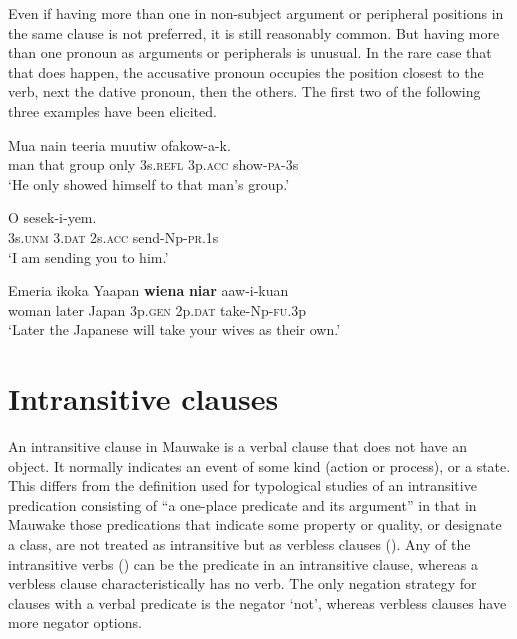 Even if having more than one  in non-subject argument or peripheral positions in the same clause is not preferred, it is still reasonably common. But having more than one pronoun as arguments or peripherals is unusual. In the rare case that that does happen, the accusative pronoun occupies the position closest to the verb, next the dative pronoun, then the others. The first two of the following three examples have been elicited.

\ea%
\label{ex:5:x1574}
\gll Mua  nain  teeria  muutiw     ofakow-a-k. \\
     man  that  group  only  3s.\textsc{refl}  3p.\textsc{acc}  show-\textsc{pa}-3s \\
\glt `He only showed himself to that man's group.'
\z

\ea%
\label{ex:5:x1577}
\gll O     sesek-i-yem. \\
     3s.\textsc{unm}  3.\textsc{dat}  2s.\textsc{acc}  send-Np-\textsc{pr}.1s \\
\glt `I am sending you to him.'
\z

\ea%
\label{ex:5:x1575}
\gll Emeria  ikoka  Yaapan  \textbf{wiena}  \textbf{niar}  aaw-i-kuan \\
     woman  later  Japan  3p.\textsc{gen}  2p.\textsc{dat}  take-Np-\textsc{fu}.3p \\
\glt `Later the Japanese will take your wives as their own.'
\z
 
\section{Intransitive clauses}

An intransitive clause in Mauwake is a verbal clause that does not have an object. It normally indicates an event of some kind (action or process), or a state. This differs from the definition used for typological studies of an intransitive predication consisting of ``a one-place predicate and its argument'' \citep[9]{Stassen1997} in that in Mauwake those predications that indicate some property or quality, or designate a class, are not treated as intransitive but as verbless clauses (). Any of the intransitive verbs () can be the predicate in an intransitive clause, whereas a verbless clause characteristically has no verb. The only negation strategy for clauses with a verbal predicate is the negator  `not', whereas verbless clauses have more negator options. 


